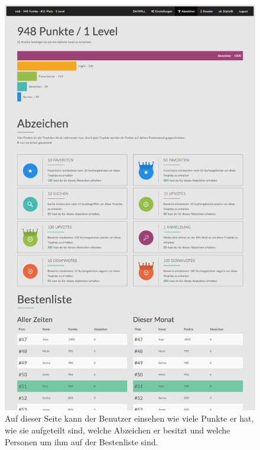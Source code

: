 \documentclass[12pt,twoside]{book}
\begin{document}
\begin{figure}[h]
    \centering
    \includegraphics[width=1.0\textwidth]{images/infoboard_usersite.png}
    \caption{Auf dieser Seite kann der Benutzer einsehen wie viele Punkte er hat, wie sie aufgeteilt sind, welche Abzeichen er besitzt und welche Personen um ihm auf der Bestenliste sind. }
    \label{fig:usersite}
\end{figure}
\end{document}
